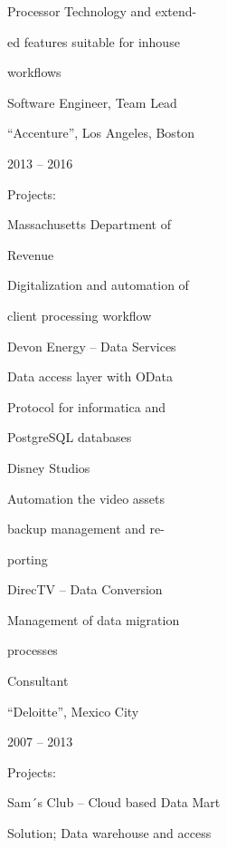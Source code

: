 \documentclass[
]{article}
\begin{document}
\protect\hypertarget{f3}{}{Processor Technology and
extend}\protect\hypertarget{f2}{}{-}

\protect\hypertarget{f3}{}{ed features suitable for inhouse}

\protect\hypertarget{f3}{}{workflows}

\protect\hypertarget{f4}{}{Software Engineer, Team Lead}

\protect\hypertarget{f4}{}{``Accenture'', Los Angeles, Boston}

\protect\hypertarget{f1}{}{2013 -- 2016}

\protect\hypertarget{f1}{}{Projects:}

\protect\hypertarget{f3}{}{Massachusetts Department of}

\protect\hypertarget{f2}{}{Revenue}

\protect\hypertarget{f3}{}{Digitalization and automation of}

\protect\hypertarget{f3}{}{client processing workflow}

\protect\hypertarget{f3}{}{Devon Energy -- Data Services}

\protect\hypertarget{f2}{}{Data access layer with OData}

\protect\hypertarget{f3}{}{Protocol for informatica and}

\protect\hypertarget{f3}{}{PostgreSQL databases}

\protect\hypertarget{f3}{}{Disney Studios}

\protect\hypertarget{f3}{}{Automation the video assets}

\protect\hypertarget{f3}{}{backup management and
re}\protect\hypertarget{f2}{}{-}

\protect\hypertarget{f3}{}{porting}

\protect\hypertarget{f3}{}{DirecTV -- Data Conversion}

\protect\hypertarget{f3}{}{Management of data migration}

\protect\hypertarget{f2}{}{processes}

\protect\hypertarget{f1}{}{Consultant}

\protect\hypertarget{f4}{}{``Deloitte'', Mexico City}

\protect\hypertarget{f1}{}{2007 -- 2013}

\protect\hypertarget{f1}{}{Projects:}

\protect\hypertarget{f3}{}{Sam´s Club -- Cloud based Data Mart}

\protect\hypertarget{f3}{}{Solution; Data warehouse and access}
\end{document}
